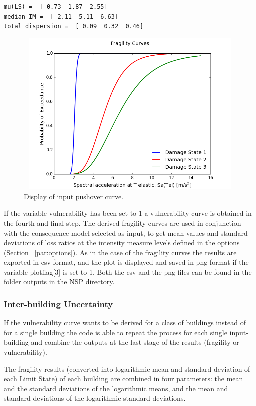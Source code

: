 \begin{Verbatim}[frame=single, commandchars=\\\{\}, samepage=true]
mu(LS) =  [ 0.73  1.87  2.55]
median IM =  [ 2.11  5.11  6.63]
total dispersion =  [ 0.09  0.32  0.46]
\end{Verbatim}

\begin{figure}[H]
\centering
\includegraphics[width=12cm,height=8cm]{./figures/fragility.png}
\caption{Display of input pushover curve.}
\label{fig:fragility}
\end{figure}

If the variable vulnerability has been set to 1 a vulnerability curve is obtained in the fourth and final step. The derived fragility curves are used in conjunction with the consequence model selected as input, to get mean values and standard deviations of loss ratios at the intensity measure levels defined in the options (Section ~\ref{par:options}).
As in the case of the fragility curves the results are exported in csv format, and the plot is displayed and saved in png format if the variable plotflag[3] is set to 1. Both the csv and the png files can be found in the folder outputs in the NSP directory.

\subsubsection{Inter-building Uncertainty}
If the vulnerability curve wants to be derived for a class of buildings instead of for a single building the code is able to repeat the process for each single input-building and combine the outputs at the last stage of the results (fragility or vulnerability). 

The fragility results (converted into logarithmic mean and standard deviation of each Limit State) of each building are combined in four parameters: the mean and the standard deviations of the logarithmic means, and the mean and standard deviations of the logarithmic standard deviations. 

